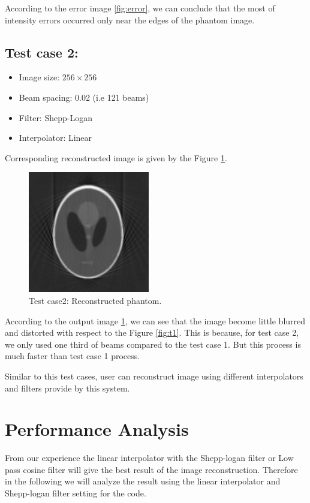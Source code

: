 According to the error image \ref{fig:error}, we can conclude that the most of intensity errors occurred only near the edges of the phantom image.




\subsection{Test case 2:}
\begin{itemize}
\item Image size: $256 \times 256$
\item Beam spacing: 0.02 (i.e 121 beams)
\item Filter: Shepp-Logan
\item Interpolator:  Linear 
\end{itemize}
Corresponding reconstructed image is given by the Figure \ref{fig:t2}.  
\begin{figure}[H]
	\centering
		\includegraphics[width=150pt]{Figures/ReconstructedImage256t2.jpg}
	\caption[Test case 2 image.]{Test case2: Reconstructed phantom.}
	\label{fig:t2}
\end{figure}
According to the output image \ref{fig:t2}, we can see that the image become little blurred and distorted with respect to the Figure \ref{fig:t1}. This is because, for test case 2, we only used one third of beams compared to the test case 1. But this process is much faster than test case 1 process. 

Similar to this test cases, user can reconstruct image using different interpolators and filters provide by this system. 

\section{Performance Analysis }
From our experience the linear interpolator with the Shepp-logan filter or Low pass cosine filter will give the best result of the image reconstruction. Therefore in the following we will analyze the result using the linear interpolator and Shepp-logan filter setting for the code.

